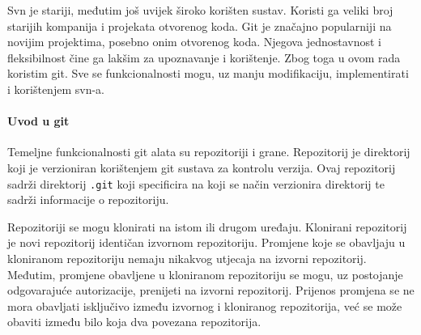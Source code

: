 \documentclass[times, utf8, diplomski, numeric]{fer}
\begin{document}
Svn je stariji, međutim još uvijek široko korišten sustav. Koristi ga veliki broj starijih kompanija i projekata otvorenog koda. Git je značajno popularniji na novijim projektima, posebno onim otvorenog koda. Njegova jednostavnost i fleksibilnost čine ga lakšim za upoznavanje i korištenje. Zbog toga u ovom rada koristim git. Sve se funkcionalnosti mogu, uz manju modifikaciju, implementirati i korištenjem svn-a.

\paragraph{Uvod u git}

Temeljne funkcionalnosti git alata su repozitoriji i grane. Repozitorij je direktorij koji je verzioniran korištenjem git sustava za kontrolu verzija. Ovaj repozitorij sadrži direktorij \verb|.git| koji specificira na koji se način verzionira direktorij te sadrži informacije o repozitoriju.

Repozitoriji se mogu klonirati na istom ili drugom uređaju. Klonirani repozitorij je novi repozitorij identičan izvornom repozitoriju. Promjene koje se obavljaju u kloniranom repozitoriju nemaju nikakvog utjecaja na izvorni repozitorij. Međutim, promjene obavljene u kloniranom repozitoriju se mogu, uz postojanje odgovarajuće autorizacije, prenijeti na izvorni repozitorij. Prijenos promjena se ne mora obavljati isključivo između izvornog i kloniranog repozitorija, već se može obaviti između bilo koja dva povezana repozitorija.
\end{document}
